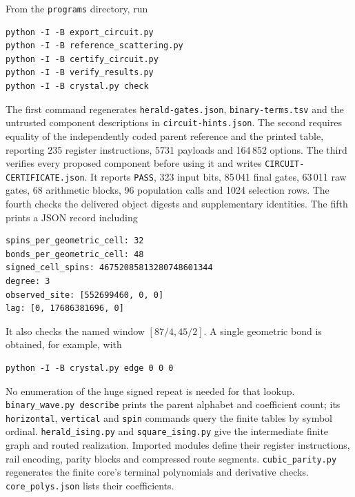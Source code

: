 From the \texttt{programs} directory, run
\begin{verbatim}
python -I -B export_circuit.py
python -I -B reference_scattering.py
python -I -B certify_circuit.py
python -I -B verify_results.py
python -I -B crystal.py check
\end{verbatim}
The first command regenerates \texttt{herald-gates.json}, \texttt{binary-terms.tsv} and the untrusted component descriptions in \texttt{circuit-hints.json}. The second requires equality of the independently coded parent reference and the printed table, reporting 235 register instructions, 5731 payloads and 164\,852 options. The third verifies every proposed component before using it and writes \texttt{CIRCUIT-CERTIFICATE.json}. It reports \texttt{PASS}, 323 input bits, 85\,041 final gates, 63\,011 raw gates, 68 arithmetic blocks, 96 population calls and 1024 selection rows. The fourth checks the delivered object digests and supplementary identities. The fifth prints a JSON record including
\begin{verbatim}
spins_per_geometric_cell: 32
bonds_per_geometric_cell: 48
signed_cell_spins: 46752085813280748601344
degree: 3
observed_site: [552699460, 0, 0]
lag: [0, 17686381696, 0]
\end{verbatim}
It also checks the named window \([87/4,45/2]\). A single geometric bond is obtained, for example, with
\begin{verbatim}
python -I -B crystal.py edge 0 0 0
\end{verbatim}
No enumeration of the huge signed repeat is needed for that lookup. \texttt{binary\_wave.py describe} prints the parent alphabet and coefficient count; its \texttt{horizontal}, \texttt{vertical} and \texttt{spin} commands query the finite tables by symbol ordinal. \texttt{herald\_ising.py} and \texttt{square\_ising.py} give the intermediate finite graph and routed realization. Imported modules define their register instructions, rail encoding, parity blocks and compressed route segments. \texttt{cubic\_parity.py} regenerates the finite core's terminal polynomials and derivative checks. \texttt{core\_polys.json} lists their coefficients.

